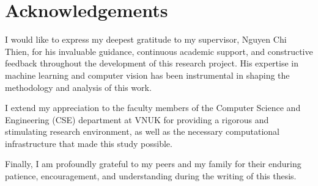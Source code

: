 \chapter*{Acknowledgements}

I would like to express my deepest gratitude to my supervisor, Nguyen Chi Thien, for his invaluable guidance, continuous academic support, and constructive feedback throughout the development of this research project. His expertise in machine learning and computer vision has been instrumental in shaping the methodology and analysis of this work.

I extend my appreciation to the faculty members of the Computer Science and Engineering (CSE) department at VNUK for providing a rigorous and stimulating research environment, as well as the necessary computational infrastructure that made this study possible.

Finally, I am profoundly grateful to my peers and my family for their enduring patience, encouragement, and understanding during the writing of this thesis.